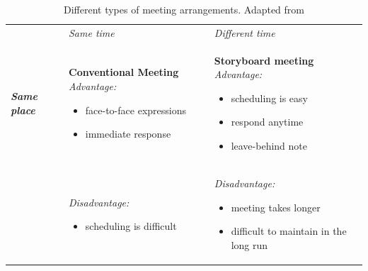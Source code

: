 \begin{table}[!htb]
\caption[Different types of meeting arrangements]{Different types of meeting arrangements. Adapted from \cite{jankowskiGISGroupDecision2001}}
\label{table:meeting_arrangements}
\begin{center}
\footnotesize
\begin{tabular}{ L{2cm} L{5.75cm}  L{5.75cm}}  \hline
 & \textit{Same time} &\textit{Different time}  \\ 
\textbf{\textit{Same place}} & \textbf{Conventional Meeting} \qquad \textit{Advantage:} 
\vspace{-3mm}
\begin{itemize}[itemsep=0pt,parsep=0pt]
    \setlength{\itemsep}{0pt}%
    \setlength{\parskip}{0pt}%
	\item{face-to-face expressions}
	\item{immediate response}
\end{itemize} &
\textbf{Storyboard meeting} \qquad \textit{Advantage:}
\vspace{-3mm} 
\begin{itemize}[itemsep=0pt,parsep=0pt]
    \setlength{\itemsep}{0pt}%
    \setlength{\parskip}{0pt}%
	\item{scheduling is easy}
	\item{respond anytime}
	\item{leave-behind note}
\end{itemize} 
\\
& \textit{Disadvantage:} 
\vspace{-3mm}
\begin{itemize}[itemsep=0pt,parsep=0pt]
    \setlength{\itemsep}{0pt}%
    \setlength{\parskip}{0pt}%
	\item{scheduling is difficult}
\end{itemize} &
\textit{Disadvantage:} 
\vspace{-3mm}
\begin{itemize}[itemsep=0pt,parsep=0pt]
    \setlength{\itemsep}{0pt}%
    \setlength{\parskip}{0pt}%
	\item{meeting takes longer}
	\item{difficult to maintain in the long run}
\end{itemize} 
\\ \hline


\end{tabular}
\end{center}
\end{table}

